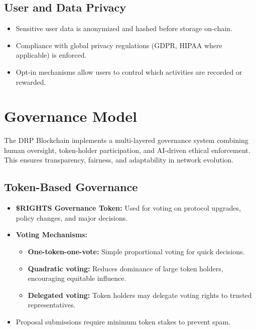 \documentclass[11pt,a4paper]{article}
\begin{document}
\subsection{User and Data Privacy}
\begin{itemize}
    \item Sensitive user data is anonymized and hashed before storage on-chain.  
    \item Compliance with global privacy regulations (GDPR, HIPAA where applicable) is enforced.  
    \item Opt-in mechanisms allow users to control which activities are recorded or rewarded.  
\end{itemize}

\section{Governance Model}

The DRP Blockchain implements a multi-layered governance system combining human oversight, token-holder participation, and AI-driven ethical enforcement. This ensures transparency, fairness, and adaptability in network evolution.

\subsection{Token-Based Governance}
\begin{itemize}
    \item \textbf{\$RIGHTS Governance Token:} Used for voting on protocol upgrades, policy changes, and major decisions.  
    \item \textbf{Voting Mechanisms:}  
        \begin{itemize}
            \item \textbf{One-token-one-vote:} Simple proportional voting for quick decisions.  
            \item \textbf{Quadratic voting:} Reduces dominance of large token holders, encouraging equitable influence.  
            \item \textbf{Delegated voting:} Token holders may delegate voting rights to trusted representatives.  
        \end{itemize}
    \item Proposal submissions require minimum token stakes to prevent spam.  
\end{itemize}
\end{document}
